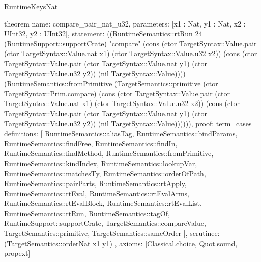 \begin{lexlean}{RuntimeKeysNat}
\begin{semanticmodule}
theorem{
  name: compare_pair_nat_u32,
  parameters: [x1 : Nat, y1 : Nat, x2 : UInt32, y2 : UInt32],
  statement: ((RuntimeSemantics::rtRun 24 (RuntimeSupport::supportCrate) "compare" (cons (ctor TargetSyntax::Value.pair (ctor TargetSyntax::Value.nat x1) (ctor TargetSyntax::Value.u32 x2)) (cons (ctor TargetSyntax::Value.pair (ctor TargetSyntax::Value.nat y1) (ctor TargetSyntax::Value.u32 y2)) (nil TargetSyntax::Value)))) = (RuntimeSemantics::fromPrimitive (TargetSemantics::primitive (ctor TargetSyntax::Prim.compare) (cons (ctor TargetSyntax::Value.pair (ctor TargetSyntax::Value.nat x1) (ctor TargetSyntax::Value.u32 x2)) (cons (ctor TargetSyntax::Value.pair (ctor TargetSyntax::Value.nat y1) (ctor TargetSyntax::Value.u32 y2)) (nil TargetSyntax::Value)))))),
  proof: term_cases{
    definitions: [
      RuntimeSemantics::aliasTag,
      RuntimeSemantics::bindParams,
      RuntimeSemantics::findFree,
      RuntimeSemantics::findIn,
      RuntimeSemantics::findMethod,
      RuntimeSemantics::fromPrimitive,
      RuntimeSemantics::kindIndex,
      RuntimeSemantics::lookupVar,
      RuntimeSemantics::matchesTy,
      RuntimeSemantics::orderOfPath,
      RuntimeSemantics::pairParts,
      RuntimeSemantics::rtApply,
      RuntimeSemantics::rtEval,
      RuntimeSemantics::rtEvalArms,
      RuntimeSemantics::rtEvalBlock,
      RuntimeSemantics::rtEvalList,
      RuntimeSemantics::rtRun,
      RuntimeSemantics::tagOf,
      RuntimeSupport::supportCrate,
      TargetSemantics::compareValue,
      TargetSemantics::primitive,
      TargetSemantics::sameOrder
    ],
    scrutinee: (TargetSemantics::orderNat x1 y1)
  },
  axioms: [Classical.choice, Quot.sound, propext]
}


\end{semanticmodule}
\end{lexlean}
